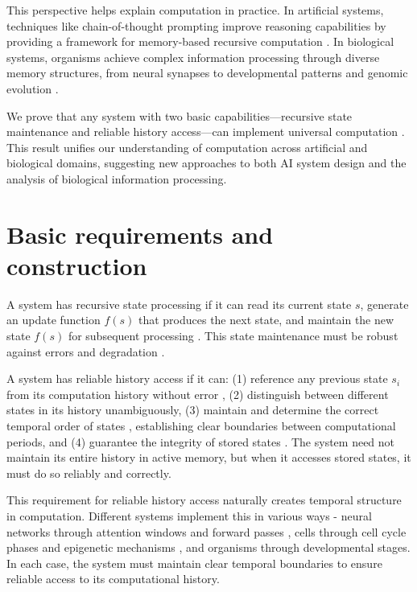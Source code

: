 \documentclass[12pt]{article}
\begin{document}
This perspective helps explain computation in practice. In artificial systems, techniques like chain-of-thought prompting improve reasoning capabilities by providing a framework for memory-based recursive computation \cite{wei2022chain,dickson2024trust,ahn2024recursive}. In biological systems, organisms achieve complex information processing through diverse memory structures, from neural synapses to developmental patterns and genomic evolution \cite{burrill2010making,espinosa2024molecular}.

We prove that any system with two basic capabilities---recursive state maintenance and reliable history access---can implement universal computation \cite{bennett1989time,boyle2024memory}. This result unifies our understanding of computation across artificial and biological domains, suggesting new approaches to both AI system design and the analysis of biological information processing.

\section{Basic requirements and construction}

A system has recursive state processing if it can read its current state $s$, generate an update function $f(s)$ that produces the next state, and maintain the new state $f(s)$ for subsequent processing \cite{manuri2019state}. This state maintenance must be robust against errors and degradation \cite{yang2013survey}.

A system has reliable history access if it can: (1) reference any previous state $s_i$ from its computation history without error \cite{fu2024memory}, (2) distinguish between different states in its history unambiguously, (3) maintain and determine the correct temporal order of states \cite{berridge2014cell,pastor2020computation}, establishing clear boundaries between computational periods, and (4) guarantee the integrity of stored states \cite{lovkvist2021using}. The system need not maintain its entire history in active memory, but when it accesses stored states, it must do so reliably and correctly.

This requirement for reliable history access naturally creates temporal structure in computation. Different systems implement this in various ways - neural networks through attention windows and forward passes \cite{martini2015information,quentin2019differential}, cells through cell cycle phases and epigenetic mechanisms \cite{bruno2022epigenetic}, and organisms through developmental stages. In each case, the system must maintain clear temporal boundaries to ensure reliable access to its computational history.
\end{document}

